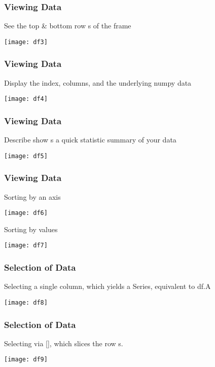 \begin{frame}[fragile]\frametitle{Viewing Data}
See the top \& bottom row s of the frame
\begin{center}
\texttt{[image: df3]}
\end{center}
\end{frame}

\begin{frame}[fragile]\frametitle{Viewing Data}
Display the index, columns, and the underlying numpy data
\begin{center}
\texttt{[image: df4]}
\end{center}
\end{frame}


\begin{frame}[fragile]\frametitle{Viewing Data}
Describe show s a quick statistic summary of your data
\begin{center}
\texttt{[image: df5]}
\end{center}
\end{frame}

\begin{frame}[fragile]\frametitle{Viewing Data}
Sorting by an axis
\begin{center}
\texttt{[image: df6]}
\end{center}
Sorting by values
\begin{center}
\texttt{[image: df7]}
\end{center}
\end{frame}

\begin{frame}[fragile]\frametitle{Selection of  Data}
Selecting a single column, which yields a Series, equivalent to df.A
\begin{center}
\texttt{[image: df8]}
\end{center}

\end{frame}

\begin{frame}[fragile]\frametitle{Selection of  Data}
Selecting via [], which slices the row s.
\begin{center}
\texttt{[image: df9]}
\end{center}
\end{frame}

